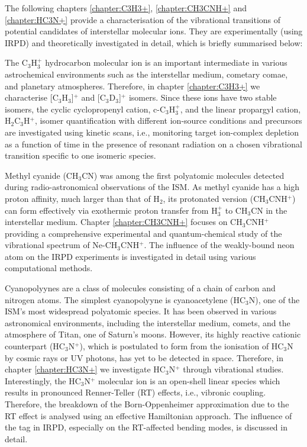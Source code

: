 The following chapters \ref{chapter:C3H3+}, \ref{chapter:CH3CNH+} and \ref{chapter:HC3N+} provide a characterisation of the vibrational transitions of potential candidates of interstellar molecular ions. They are experimentally (using IRPD) and theoretically investigated in detail, which is briefly summarised below:

The C$_3$H$_3^+$ hydrocarbon molecular ion is an important intermediate in various astrochemical environments such as the interstellar medium, cometary comae, and planetary atmospheres. Therefore, in chapter \ref{chapter:C3H3+} we characterise [C$_3$H$_3$]$^+$ and [C$_3$D$_3$]$^+$ isomers. Since these ions have two stable isomers, the cyclic cyclopropenyl cation, c-C$_3$H$_3^+$, and the linear propargyl cation, H$_2$C$_3$H$^+$, isomer quantification with different ion-source conditions and precursors are investigated using kinetic scans, i.e., monitoring target ion-complex depletion as a function of time in the presence of resonant radiation on a chosen vibrational transition specific to one isomeric species.

Methyl cyanide (CH$_3$CN) was among the first polyatomic molecules detected during radio-astronomical observations of the ISM. As methyl cyanide has a high proton affinity, much larger than that of H$_2$, its protonated version (CH$_3$CNH$^+$) can form effectively via exothermic proton transfer from H$_3^+$ to CH$_3$CN in the interstellar medium. Chapter \ref{chapter:CH3CNH+} focuses on CH$_3$CNH$^+$ providing a comprehensive experimental and quantum-chemical study of the vibrational spectrum of Ne-CH$_3$CNH$^+$. The influence of the weakly-bound neon atom on the IRPD experiments is investigated in detail using various computational methods.

Cyanopolyynes are a class of molecules consisting of a chain of carbon and nitrogen atoms. The simplest cyanopolyyne is cyanoacetylene (HC$_3$N), one of the ISM's most widespread polyatomic species. It has been observed in various astronomical environments, including the interstellar medium, comets, and the atmosphere of Titan, one of Saturn's moons. However, its highly reactive cationic counterpart (HC$_3$N$^+$), which is postulated to form from the ionisation of HC$_3$N by cosmic rays or UV photons, has yet to be detected in space. Therefore, in chapter \ref{chapter:HC3N+} we investigate HC$_3$N$^+$ through vibrational studies. Interestingly, the HC$_3$N$^+$ molecular ion is an open-shell linear species which results in pronounced Renner-Teller (RT) effects, i.e., vibronic coupling. Therefore, the breakdown of the Born-Oppenheimer approximation due to the RT effect is analysed using an effective Hamiltonian approach. The influence of the tag in IRPD, especially on the RT-affected bending modes, is discussed in detail.

